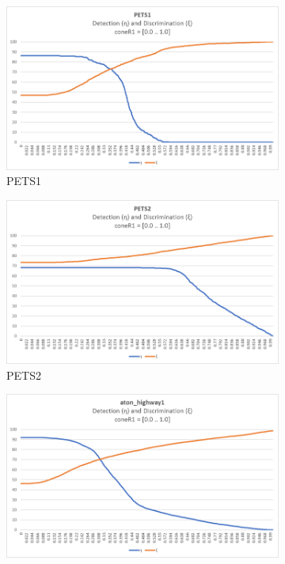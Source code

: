 \begin{figure}
  \begin{subfigure}{.45\linewidth}
  \includegraphics[width=1\linewidth]{figures/pets1_coneR1_response.jpg}
  \caption{PETS1}
\end{subfigure}
\hfill
\begin{subfigure}{.45\linewidth}
  \includegraphics[width=1\linewidth]{figures/pets2_coneR1_response.jpg}
  \caption{PETS2}
\end{subfigure}
\hfill
\begin{subfigure}{.45\linewidth}
  \includegraphics[width=1\linewidth]{figures/highway1_coneR1_response.jpg}

\end{subfigure}
\end{figure}
